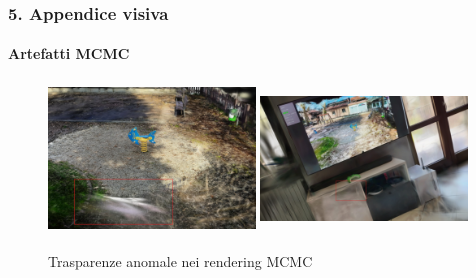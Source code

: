 \subsubsection*{5. Appendice visiva}

\paragraph{Artefatti MCMC}
\begin{figure}[H]
	\centering
	\includegraphics[width=0.49\textwidth,height=4cm,trim={80 40 80 40},clip]{images/benchmarks/spring_rider_mcmc_defect.jpg}
	\includegraphics[width=0.49\textwidth,height=4cm,trim={80 40 80 40},clip]{images/benchmarks/my_workstation_mcmc_defect.jpg}
	\caption{Trasparenze anomale nei rendering MCMC}
	\label{fig:mcmc_transparency_defects}
\end{figure}

